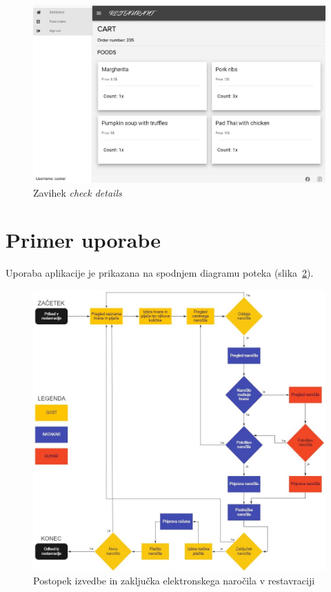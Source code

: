 \documentclass[a4paper, 12pt]{book}
\begin{document}
\begin{figure}[!htb]
\centering
\includegraphics[width=13.7cm]{cooker_2.jpg}
\caption{Zavihek \textit{check details}}
\label{Kuhar_3}
\end{figure}

\clearpage
\section{Primer uporabe}
Uporaba aplikacije je prikazana na spodnjem diagramu poteka (slika~\ref{Diagram1}).
\begin{figure}[!htb]
\centering
\includegraphics[width=13cm]{Diagram_poteka.jpg}
\caption{Postopek izvedbe in zaključka elektronskega naročila v restavraciji}
\label{Diagram1}
\end{figure}
\end{document}
